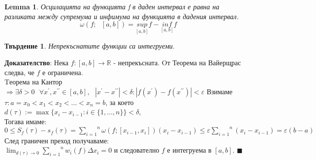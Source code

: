\documentclass[12pt]{article}
\newtheorem{proposition}{Твърдение}
\newtheorem{lemma}{Lemma}
\newcommand{\suma}[2]{\overset{#2}{\underset{#1}{\sum}}}
\newcommand{\spc}{\text{ }}
\begin{document}
	\begin{lemma}
		Осцилацията на функцията f в даден интервал е равна на разликата между супремума и инфимума на функцията в дадения интервал.
		\[\omega(f;\spc[a,b]) = \underset{\left[a, b\right]}{sup} f - \underset{\left[a, b\right]}{inf} f\]
	\end{lemma}
%
%

	\begin{proposition}
		Непрекъснатите функции са интегруеми.
	\end{proposition}
	\textbf{Доказателство}: Нека $f:[a,b] \rightarrow \mathbb{R}$ - непрекъсната. Oт Теорема на Вайерщрас следва, че $f$ е ограничена.\\
	Tеорема на Кантор $ \Rightarrow \exists \delta>0\spc\forall {x}^{\prime}, {x}^{\prime\prime} \in [a,b],\spc |{x}^{\prime} - {x}^{\prime\prime}|<\delta : |f({x}^{\prime}) - f({x}^{\prime\prime})| < \varepsilon $ 
	Взимаме $\tau : a=x_{0}<x_{1}<x_{2}<...<x_{n}=b$, за което\\ $d(\tau):=\max{\{x_i - x_{i-1} : i\in\{1,...,n\}\}} < \delta$,\\
	Тогава имаме:\\
	$0 \leq S_f(\tau) - s_f(\tau) = \suma{i=1}{n}\omega(f; [x_{i-1}, x_i])(x_i - x_{i-1}) \leq \varepsilon \suma{i=1}{n}(x_i - x_{i-1}) = \varepsilon(b-a)$\\
	След граничен преход получаваме:\\
	$\lim_{d(\tau) \to 0}\suma{i=1}{n}w_i(f)\Delta x_i = 0$ и следователно $f$ е интегруема в $[a,b]$. $\blacksquare$

%
%
%
\end{document}
